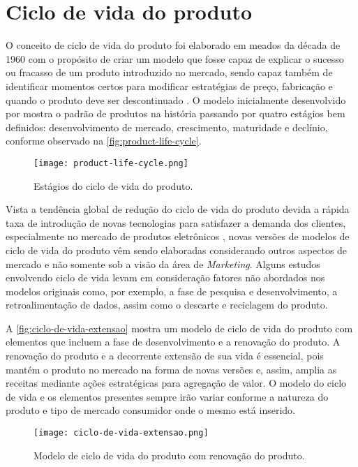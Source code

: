 \section{Ciclo de vida do produto}
\label{sec:ciclo-de-vida}

O conceito de ciclo de vida do produto foi elaborado em meados da década de 1960 com o propósito de criar um modelo que fosse capaz de explicar o sucesso ou fracasso de um produto introduzido no mercado, sendo capaz também de identificar momentos certos para modificar estratégias de preço, fabricação e quando o produto deve ser descontinuado \cite{cao2012lifecycle}. O modelo inicialmente desenvolvido por  mostra o padrão de produtos na história passando por quatro estágios bem definidos: desenvolvimento de mercado, crescimento, maturidade e declínio, conforme observado na \autoref{fig:product-life-cycle}.

\begin{figure}[t]
	\centering
	\texttt{[image: product-life-cycle.png]}
	\caption{Estágios do ciclo de vida do produto.}
	\label{fig:product-life-cycle}
\end{figure}

Vista a tendência global de redução do ciclo de vida do produto devida a rápida taxa de introdução de novas tecnologias para satisfazer a demanda dos clientes, especialmente no mercado de produtos eletrônicos \cite{trappey2008lifecycle}, novas versões de modelos de ciclo de vida do produto vêm sendo elaboradas considerando outros aspectos de mercado e não somente sob a visão da área de \textit{Marketing}. Alguns estudos \cite{cao2012lifecycle} envolvendo ciclo de vida levam em consideração fatores não abordados nos modelos originais como, por exemplo, a fase de pesquisa e desenvolvimento, a retroalimentação de dados, assim como o descarte e reciclagem do produto.

A \autoref{fig:ciclo-de-vida-extensao} mostra um modelo de ciclo de vida do produto com elementos que incluem a fase de desenvolvimento e a renovação do produto. A renovação do produto e a decorrente extensão de sua vida é essencial, pois mantém o produto no mercado na forma de novas versões e, assim, amplia as receitas mediante ações estratégicas para agregação de valor. O modelo do ciclo de vida e os elementos presentes sempre irão variar conforme a natureza do produto e tipo de mercado consumidor onde o mesmo está inserido.

\begin{figure}[t]
	\centering
	\texttt{[image: ciclo-de-vida-extensao.png]}
	\caption{Modelo de ciclo de vida do produto com renovação do produto.}
	\label{fig:ciclo-de-vida-extensao}
\end{figure}

